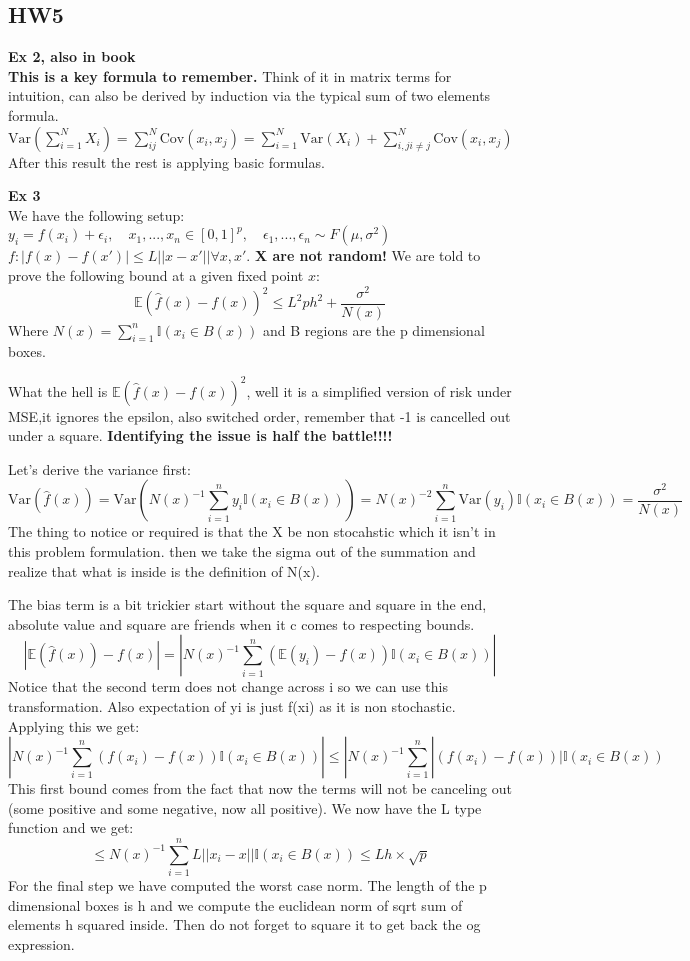 \documentclass{article}
\begin{document}
\subsection*{HW5}
\textbf{Ex 2, also in book}\\
\textbf{This is a key formula to remember.} Think of it in matrix terms for intuition, can also be 
derived by induction via the typical sum of two elements formula.
\noindent
$\text{Var}(\sum_{i=1}^{N}X_i) = \sum_{ij}^{N} \text{Cov}(x_i, x_j) = \sum_{i=1}^{N}\text{Var}(X_i) + \sum_{i,j i\neq j}^{N}\text{Cov}(x_i,x_j)$
After this result the rest is applying basic formulas. 

\textbf{Ex 3}\\
We have the following setup: $y_i = f(x_i) + \epsilon_i, \quad x_1,...,x_n \in [0,1]^p, \quad \epsilon_1,...,\epsilon_n \sim F(\mu,\sigma^2)$ 
$f : |f(x) - f(x')| \leq L||x- x'|| \forall x,x'$. 
\textbf{X are not random!}
We are told to prove the following bound at a given fixed point $x$: 
$$\mathbb{E}(\hat{f}(x)-f(x))^2 \leq L^2ph^2 + \frac{\sigma^2}{N(x)} $$
Where $N(x) = \sum_{i=1}^{n}\mathbb{I}(x_i \in B(x))$ and B regions are the p dimensional boxes. 

What the hell is $\mathbb{E}(\hat{f}(x)-f(x))^2$, well it is a simplified version of risk under MSE,it ignores the epsilon, also switched order, remember that -1 is cancelled out 
under a square. \textbf{Identifying the issue is half the battle!!!!} 

Let's derive the variance first:
$$\text{Var}(\hat{f}(x)) = \text{Var}(N(x)^{-1}\sum_{i=1}^{n}y_i\mathbb{I}(x_i \in B(x)))
= N(x)^{-2}\sum_{i=1}^{n}\text{Var}(y_i)\mathbb{I}(x_i \in B(x)) = \frac{\sigma^2}{N(x)}
$$
The thing to notice or required is that the X be non stocahstic which it isn't in this problem formulation. 
then we take the sigma out of the summation and realize that what is inside is the definition of N(x). 

The bias term is a bit trickier start without the square and square in the end, absolute value and square are friends when it c
comes to respecting bounds.
$$|\mathbb{E}(\hat{f}(x)) -f(x)| = |N(x)^{-1}\sum_{i=1}^{n}(\mathbb{E}(y_i) -f(x))\mathbb{I}(x_i \in B(x)) |$$
Notice that the second term does not change across i so we can use this transformation. Also expectation of yi is just f(xi) as it is non stochastic.
Applying this we get:
$$|N(x)^{-1}\sum_{i=1}^{n}(f(x_i) -f(x))\mathbb{I}(x_i \in B(x)) | \leq |N(x)^{-1}\sum_{i=1}^{n}|(f(x_i) -f(x))|\mathbb{I}(x_i \in B(x)) $$
This first bound comes from the fact that now the terms will not be canceling out (some positive and some negative, now all positive). 
We now have the L type function and we get: 
$$\leq N(x)^{-1}\sum_{i=1}^{n}L||x_i - x||\mathbb{I}(x_i \in B(x))  \leq L h \times \sqrt{p}$$
For the final step we have computed the worst case norm. The length of the p dimensional boxes is h and we compute the euclidean norm of sqrt sum of elements h squared inside.
Then do not forget to square it to get back the og expression.
\end{document}
